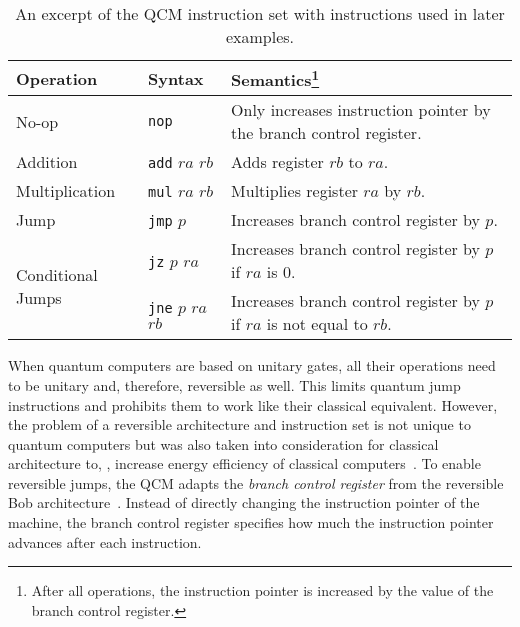 \begin{table}[htp]
    \centering
    \begin{tabular}{llp{}}
        \multicolumn{1}{l|}{Operation}                          & \multicolumn{1}{l|}{Syntax}                                      & Semantics\footnote{After all operations, the instruction pointer is increased by the value of the branch control register.}                                                              \\ \hline
        
        \multicolumn{1}{l|}{No-op}                              & \multicolumn{1}{l|}{\texttt{nop}}               & Only increases instruction pointer by the branch control register.     \\ \hline
        
        \multicolumn{1}{l|}{Addition}                           & \multicolumn{1}{l|}{\texttt{add} $ra$ $rb$}     & Adds register $rb$ to $ra$.                                            \\
        \multicolumn{1}{l|}{Multiplication}                     & \multicolumn{1}{l|}{\texttt{mul} $ra$ $rb$}     & Multiplies register $ra$ by $rb$.                                      \\ \hline
        
        \multicolumn{1}{l|}{Jump}                               & \multicolumn{1}{l|}{\texttt{jmp} $p$}           & Increases branch control register by $p$.                              \\
        \multicolumn{1}{l|}{\multirow{2}{*}{Conditional Jumps}} & \multicolumn{1}{l|}{\texttt{jz} $p$ $ra$}       & Increases branch control register by $p$ if $ra$ is $0$.               \\
        \multicolumn{1}{l|}{}                                   & \multicolumn{1}{l|}{\texttt{jne} $p$ $ra$ $rb$} & Increases branch control register by $p$ if $ra$ is not equal to $rb$. 
    \end{tabular}
    \caption{An excerpt of the QCM instruction set with instructions used in later examples.}
    \label{tab:qcm_instructionset}
\end{table}

When quantum computers are based on unitary gates, all their operations need to be unitary and, therefore, reversible as well. This limits quantum jump instructions and prohibits them to work like their classical equivalent. However, the problem of a reversible architecture and instruction set is not unique to quantum computers but was also taken into consideration for classical architecture to, \eg, increase energy efficiency of classical computers~\cite{AGY07, TAG12}. 
To enable reversible jumps, the QCM adapts the \emph{branch control register} from the reversible Bob architecture~\cite{TAG12}. Instead of directly changing the instruction pointer of the machine, the branch control register specifies how much the instruction pointer advances after each instruction.

